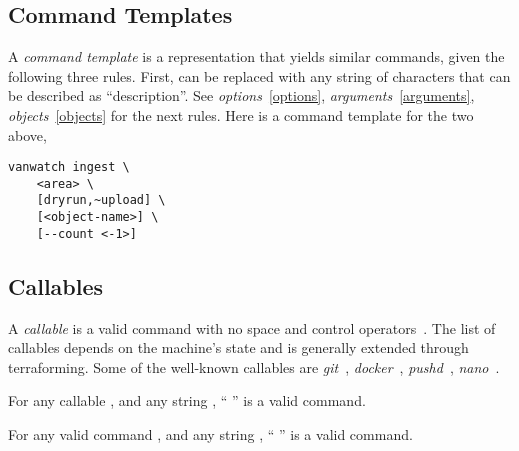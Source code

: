 \subsection{Command Templates}
\label{command-template}

A \emph{command template} is a representation that yields similar commands, given the following three rules. First,  can be replaced with any string of characters that can be described as ``description''. See \emph{options}~\ref{options}, \emph{arguments}~\ref{arguments}, \emph{objects}~\ref{objects} for the next rules. Here is a command template for the two above,
%
\begin{verbatim}
vanwatch ingest \
    <area> \
    [dryrun,~upload] \
    [<object-name>] \
    [--count <-1>]
\end{verbatim}

\subsection{Callables}
\label{callables}

A \emph{callable} is a valid command with no space and control operators~. The list of callables depends on the machine's state and is generally extended through terraforming. Some of the well-known callables are \emph{git}~, \emph{docker}~, \emph{pushd}~, \emph{nano}~. 

\begin{theorem}
For any callable , and any string , `` '' is a valid command.
\end{theorem}

\begin{theorem}
For any valid command \placeholder{command}, and any string \placeholder{suffix}, ``\placeholder{command} \placeholder{suffix}'' is a valid command.
\end{theorem}